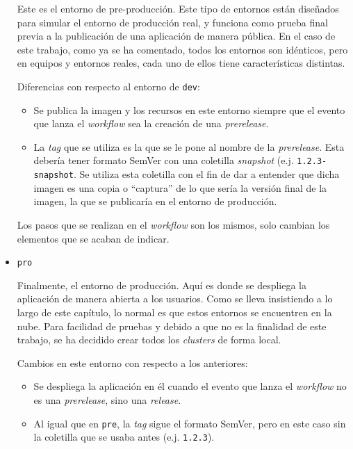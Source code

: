 \begin{itemize}
    Este es el entorno de pre-producción. Este tipo de entornos están diseñados para simular el entorno de producción real, y funciona como prueba final previa a la publicación de una aplicación de manera pública. En el caso de este trabajo, como ya se ha comentado, todos los entornos son idénticos, pero en equipos y entornos reales, cada uno de ellos tiene características distintas.

    Diferencias con respecto al entorno de \texttt{dev}:

    \begin{itemize}
      \item Se publica la imagen y los recursos en este entorno siempre que el evento que lanza el \textit{workflow} sea la creación de una \textit{prerelease}.
      \item La \textit{tag} que se utiliza es la que se le pone al nombre de la \textit{prerelease}. Esta debería tener formato SemVer\cite{semver} con una coletilla \textit{snapshot} (e.j. \texttt{1.2.3-snapshot}. Se utiliza esta coletilla con el fin de dar a entender que dicha imagen es una copia o ``captura'' de lo que sería la versión final de la imagen, la que se publicaría en el entorno de producción.
    \end{itemize}

    Los pasos que se realizan en el \textit{workflow} son los mismos, solo cambian los elementos que se acaban de indicar.

  \item \texttt{pro}

    Finalmente, el entorno de producción. Aquí es donde se despliega la aplicación de manera abierta a los usuarios. Como se lleva insistiendo a lo largo de este capítulo, lo normal es que estos entornos se encuentren en la nube. Para facilidad de pruebas y debido a que no es la finalidad de este trabajo, se ha decidido crear todos los \textit{clusters} de forma local.

    Cambios en este entorno con respecto a los anteriores:

    \begin{itemize}
      \item Se despliega la aplicación en él cuando el evento que lanza el \textit{workflow} no es una \textit{prerelease}, sino una \textit{release}.
      \item Al igual que en \texttt{pre}, la \textit{tag} sigue el formato SemVer, pero en este caso sin la coletilla que se usaba antes (e.j. \texttt{1.2.3}).
    \end{itemize}

\end{itemize}


